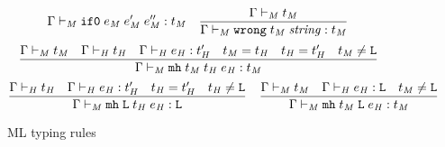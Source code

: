 \begin{figure}[p]
\[{\Gamma \vdash_{\mathit{M}} \mathtt{if0} \; e_{\mathit{M}} \; e_{\mathit{M}}' \; e_{\mathit{M}}'' : t_{\mathit{M}}}
\quad
\frac
{\Gamma \vdash_{\mathit{M}} t_{\mathit{M}}}
{\Gamma \vdash_{\mathit{M}} \mathtt{wrong} \; t_{\mathit{M}} \; \mathit{string} : t_{\mathit{M}}}
\]
\[
\frac
{\Gamma \vdash_{\mathit{M}} t_{\mathit{M}} \quad \Gamma \vdash_{\mathit{H}} t_{\mathit{H}} \quad \Gamma \vdash_{\mathit{H}} e_{\mathit{H}} : t_{\mathit{H}}' \quad t_{\mathit{M}} = t_{\mathit{H}} \quad t_{\mathit{H}} = t_{\mathit{H}}' \quad t_{\mathit{M}} \neq \mathtt{L}}
{\Gamma \vdash_{\mathit{M}} \mathtt{mh} \; t_{\mathit{M}} \; t_{\mathit{H}} \; e_{\mathit{H}} : t_{\mathit{M}}}
\]
\[
\frac
{\Gamma \vdash_{\mathit{H}} t_{\mathit{H}} \quad \Gamma \vdash_{\mathit{H}} e_{\mathit{H}} : t_{\mathit{H}}' \quad t_{\mathit{H}} = t_{\mathit{H}}' \quad t_{\mathit{H}} \neq \mathtt{L}}
{\Gamma \vdash_{\mathit{M}} \mathtt{mh} \; \mathtt{L} \; t_{\mathit{H}} \; e_{\mathit{H}} : \mathtt{L}}
\quad
\frac
{\Gamma \vdash_{\mathit{M}} t_{\mathit{M}} \quad \Gamma \vdash_{\mathit{H}} e_{\mathit{H}} : \mathtt{L} \quad t_{\mathit{M}} \neq \mathtt{L}}
{\Gamma \vdash_{\mathit{M}} \mathtt{mh} \; t_{\mathit{M}} \; \mathtt{L} \; e_{\mathit{H}} : t_{\mathit{M}}}
\]
\caption{ML typing rules}
\label{mtr}
\end{figure}